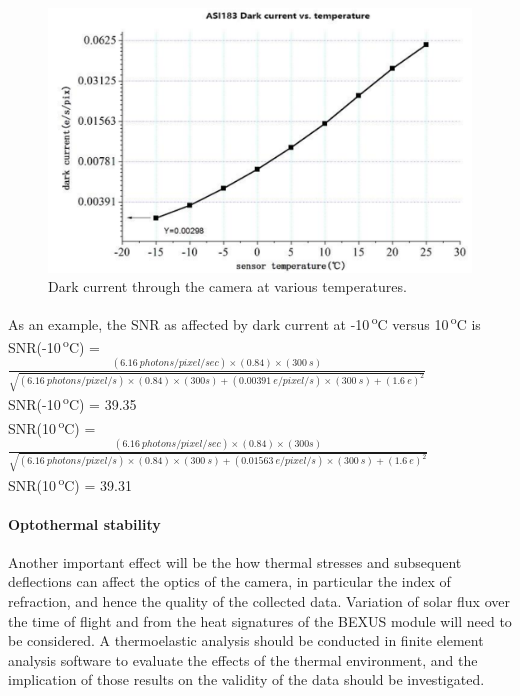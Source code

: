 	\begin{figure}[h!]
    \centering
    \includegraphics[scale=0.8]{4-experiment-design/img/mechanical/darkcurrent.png}
    	\caption{Dark current through the camera at various temperatures.}
	\label{fig:darkcurrent}
	\end{figure}

As an example, the SNR as affected by dark current at -10\,\textsuperscript{o}C versus 10\,\textsuperscript{o}C is\\

 SNR(-10\,\textsuperscript{o}C) =  $\frac{(\SI{6.16}{photons \per pixel \per sec})\times (0.84)\times (\SI{300}{s})}{\sqrt{(\SI{6.16}{photons \per pixel \per s})\times (0.84)\times (300s)+(\SI{0.00391}{e \per pixel \per s})\times (\SI{300}{s})+(\SI{1.6}{e})^2}}$ \\

 SNR(-10\,\textsuperscript{o}C) = 39.35\\

 SNR(10\,\textsuperscript{o}C) =  $\frac{(\SI{6.16}{photons \per pixel \per sec})\times (0.84)\times (300s)}{\sqrt{(\SI{6.16}{photons \per pixel \per s})\times (0.84)\times (\SI{300}{s})+(\SI{0.01563}{e \per pixel \per s})\times (\SI{300}{s})+(\SI{1.6}{e})^2}}$ \\

 SNR(10\,\textsuperscript{o}C) = 39.31\\


\paragraph{Optothermal stability}
Another important effect will be the how thermal stresses and subsequent deflections can affect the optics of the camera, in particular the index of refraction, and hence the quality of the collected data. Variation of solar flux over the time of flight and from the heat signatures of the BEXUS module will need to be considered. A thermoelastic analysis should be conducted in finite element analysis software to evaluate the effects of the thermal environment, and the implication of those results on the validity of the data should be investigated. \

